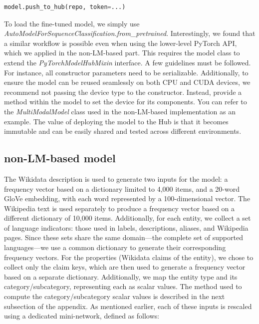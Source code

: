 \documentclass[11pt]{article}
\begin{document}
	\small
	\begin{lstlisting}[language=python]
model.push_to_hub(repo, token=...)
	\end{lstlisting}
\normalsize
To load the fine-tuned model, we simply use \emph{AutoModelForSequenceClassification.from\_pretrained}. \newline Interestingly, we found that a similar workflow is possible even when using the lower-level PyTorch API, which we applied in the non-LM-based part. This requires the model class to extend the \emph{PyTorchModelHubMixin} interface. \newline A few guidelines must be followed. For instance, all constructor parameters need to be serializable. Additionally, to ensure the model can be reused seamlessly on both CPU and CUDA devices, we recommend not passing the device type to the constructor. Instead, provide a method within the model to set the device for its components. You can refer to the  \emph{MultiModalModel} class used in the non-LM-based implementation as an example. \newline The value of deploying the model to the Hub is that it becomes immutable and can be easily shared and tested across different environments.
	
\subsection{non-LM-based model}
The Wikidata description is used to generate two inputs for the model: a frequency vector based on a dictionary limited to 4,000 items, and a 20-word GloVe embedding, with each word represented by a 100-dimensional vector. The Wikipedia text is used separately to produce a frequency vector based on a different dictionary of 10,000 items. Additionally, for each entity, we collect a set of language indicators: those used in labels, descriptions, aliases, and Wikipedia pages. Since these sets share the same domain—the complete set of supported languages—we use a common dictionary to generate their corresponding frequency vectors. \newline For the properties (Wikidata claims of the entity), we chose to collect only the claim keys, which are then used to generate a frequency vector based on a separate dictionary. Additionally, we map the entity type and its category/subcategory, representing each as scalar values. The method used to compute the category/subcategory scalar values is described in the next subsection of the appendix. \newline As mentioned earlier, each of these inputs is rescaled using a dedicated mini-network, defined as follows:
\end{document}
